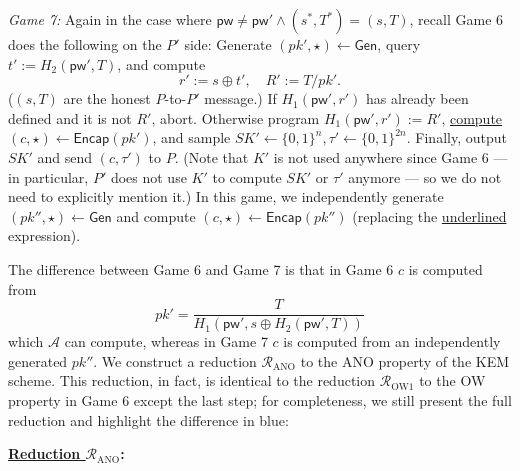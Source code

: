 \documentclass{article}
\theoremstyle{plain}
\theoremstyle{definition}
\theoremstyle{remark}
\newcommand{\adv}{\mathcal{A}}
\newcommand{\red}{\mathcal{R}}
\newcommand{\Gen}{\mathsf{Gen}}
\newcommand{\Encap}{\mathsf{Encap}}
\newcommand{\pw}{\mathsf{pw}}
\begin{document}
\medskip\noindent\emph{Game 7:} Again in the case where $\pw \neq \pw' \land (s^*,T^*) = (s,T)$, recall Game 6 does the following on the $P'$ side: {\color{brown}Generate $(pk',\star) \gets \Gen$, query $t' := H_2(\pw',T)$, and compute
\[
r' := s \oplus t', \quad R' := T/pk'.
\]
($(s,T)$ are the honest $P$-to-$P'$ message.) If $H_1(\pw',r')$ has already been defined and it is not $R'$, abort. Otherwise program $H_1(\pw',r') := R'$}, \ul{compute $(c,\star) \gets \Encap(pk')$}, and sample $SK' \gets \{0,1\}^n, \tau' \gets \{0,1\}^{2n}$. Finally, output $SK'$ and send $(c,\tau')$ to $P$. (Note that $K'$ is not used anywhere since Game 6 --- in particular, $P'$ does not use $K'$ to compute $SK'$ or $\tau'$ anymore --- so we do not need to explicitly mention it.) In this game, we independently generate $(pk'',\star) \gets \Gen$ and compute $(c,\star) \gets \Encap(pk'')$ (replacing the \underline{underlined} expression).

The difference between Game 6 and Game 7 is that in Game 6 $c$ is computed from
\[
pk' = \frac{T}{H_1(\pw',s \oplus H_2(\pw',T))}
\]
which $\adv$ can compute, whereas in Game 7 $c$ is computed from an independently generated $pk''$. We construct a reduction $\red_\text{ANO}$ to the ANO property of the KEM scheme. This reduction, in fact, is identical to the reduction $\red_\text{OW1}$ to the OW property in Game 6 except the last step; for completeness, we still present the full reduction and highlight the difference in {\color{blue}blue}:

\medskip\noindent\textbf{\underline{Reduction $\red_\mathrm{ANO}$}:}
\end{document}
